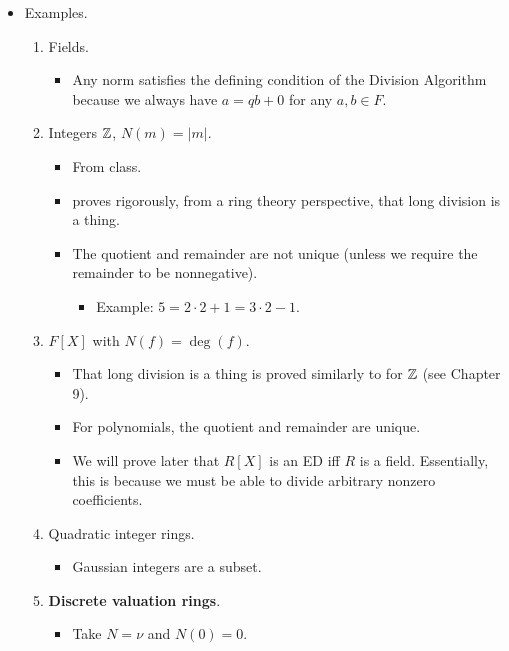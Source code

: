 \documentclass[../notes.tex]{subfiles}
\begin{document}
\begin{itemize}
    \item Examples.
    \begin{enumerate}
        \item Fields.
        \begin{itemize}
            \item Any norm satisfies the defining condition of the Division Algorithm because we always have $a=qb+0$ for any $a,b\in F$.
        \end{itemize}
        \item Integers $\mathbb{Z}$, $N(m)=|m|$.
        \begin{itemize}
            \item From class.
            \item \textcite{bib:DummitFoote} proves rigorously, from a ring theory perspective, that long division is a thing.
            \item The quotient and remainder are not unique (unless we require the remainder to be nonnegative).
            \begin{itemize}
                \item Example: $5=2\cdot 2+1=3\cdot 2-1$.
            \end{itemize}
        \end{itemize}
        \item $F[X]$ with $N(f)=\deg(f)$.
        \begin{itemize}
            \item That long division is a thing is proved similarly to for $\mathbb{Z}$ (see Chapter 9).
            \item For polynomials, the quotient and remainder are unique.
            \item We will prove later that $R[X]$ is an ED iff $R$ is a field. Essentially, this is because we must be able to divide arbitrary nonzero coefficients.
        \end{itemize}
        \item Quadratic integer rings.
        \begin{itemize}
            \item Gaussian integers are a subset.
        \end{itemize}
        \item \textbf{Discrete valuation rings}.
        \begin{itemize}
            \item Take $N=\nu$ and $N(0)=0$.
        \end{itemize}
    \end{enumerate}

\end{itemize}
\end{document}
